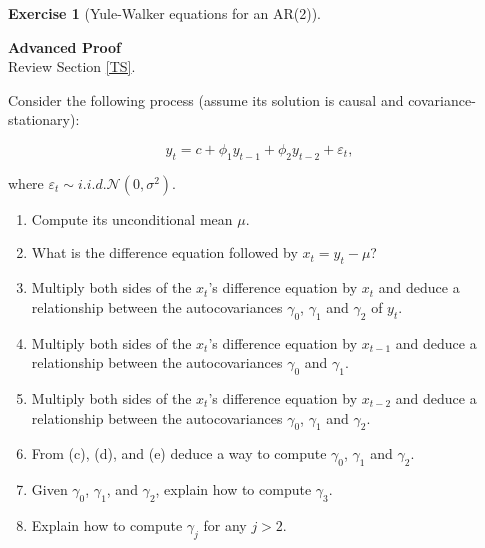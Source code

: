 \documentclass[
  11pt,
]{book}
\theoremstyle{definition}
\theoremstyle{definition}
\theoremstyle{definition}
\newtheorem{exercise}{Exercise}[chapter]
\theoremstyle{definition}
\theoremstyle{remark}
\begin{document}
\begin{exercisebox}

\begin{exercise}[Yule-Walker equations for an AR(2)]
\protect\hypertarget{exr:time-series-yule-walker}{}\label{exr:time-series-yule-walker}

\textbf{Advanced \textbar{} Proof}\\
Review Section \ref{TS}.

Consider the following process (assume its solution is causal and covariance-stationary):

\[y_t = c + \phi_1 y_{t-1} + \phi_2 y_{t-2} + \varepsilon_t,\]

where \(\varepsilon_t \sim i.i.d. \mathcal{N}(0, \sigma^2)\).

\begin{enumerate}
\def\labelenumi{\arabic{enumi}.}
\item
  Compute its unconditional mean \(\mu\).
\item
  What is the difference equation followed by \(x_t = y_t - \mu\)?
\item
  Multiply both sides of the \(x_t\)'s difference equation by \(x_t\) and deduce a relationship between the autocovariances \(\gamma_0\), \(\gamma_1\) and \(\gamma_2\) of \(y_t\).
\item
  Multiply both sides of the \(x_t\)'s difference equation by \(x_{t-1}\) and deduce a relationship between the autocovariances \(\gamma_0\) and \(\gamma_1\).
\item
  Multiply both sides of the \(x_t\)'s difference equation by \(x_{t-2}\) and deduce a relationship between the autocovariances \(\gamma_0\), \(\gamma_1\) and \(\gamma_2\).
\item
  From (c), (d), and (e) deduce a way to compute \(\gamma_0\), \(\gamma_1\) and \(\gamma_2\).
\item
  Given \(\gamma_0\), \(\gamma_1\), and \(\gamma_2\), explain how to compute \(\gamma_3\).
\item
  Explain how to compute \(\gamma_j\) for any \(j>2\).
\end{enumerate}

\end{exercise}

\end{exercisebox}

\end{document}
